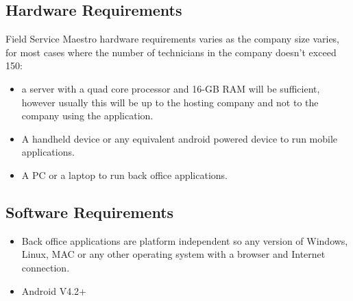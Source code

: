\subsection{Hardware Requirements}
	Field Service Maestro hardware requirements varies as the company size varies, for most cases where the number of technicians in the company doesn't exceed 150:
	\begin{itemize}
		\item a server with a quad core processor and 16-GB RAM will be sufficient, however usually this will be up to the hosting company and not to the company using the application.
		\item A handheld device or any equivalent android powered device to run mobile applications.
		\item A PC or a laptop to run back office applications.	\end{itemize} 
\subsection{Software Requirements}
	\begin{itemize}
		\item Back office applications are platform independent so any version of Windows, Linux, MAC or any other operating system with a browser and Internet connection.
		\item Android V4.2+
	\end{itemize}
	